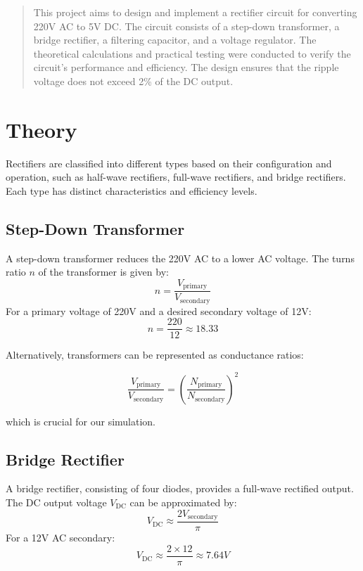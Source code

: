 \documentclass{zc-ust-hw}
\begin{document}
\maketitle
\tableofcontents

\begin{abstract}
This project aims to design and implement a rectifier circuit for converting
220V AC to 5V DC. The circuit consists of a step-down transformer, a bridge
rectifier, a filtering capacitor, and a voltage regulator. The theoretical
calculations and practical testing were conducted to verify the circuit's
performance and efficiency. The design ensures that the ripple voltage does not
exceed 2\% of the DC output.
\end{abstract}

\newpage

\section{Theory}
Rectifiers are classified into different types based on their configuration and
operation, such as half-wave rectifiers, full-wave rectifiers, and bridge
rectifiers. Each type has distinct characteristics and efficiency levels.

\subsection{Step-Down Transformer}
A step-down transformer reduces the 220V AC to a lower AC voltage. The turns ratio \( n \) of the transformer is given by:
\[
n = \frac{V_{\text{primary}}}{V_{\text{secondary}}}
\]
For a primary voltage of 220V and a desired secondary voltage of 12V:
\[
n = \frac{220}{12} \approx 18.33
\]

Alternatively, transformers can be represented as conductance ratios:

\[
\frac{V_{\text{primary}}}{V_{\text{secondary}}} = \left( \frac{N_{\text{primary}}}{N_{\text{secondary}}} \right)^2
\] 

which is crucial for our simulation.

\subsection{Bridge Rectifier}
A bridge rectifier, consisting of four diodes, provides a full-wave rectified output. The DC output voltage \( V_{\text{DC}} \) can be approximated by:
\[
V_{\text{DC}} \approx \frac{2V_{\text{secondary}}}{\pi}
\]
For a 12V AC secondary:
\[
V_{\text{DC}} \approx \frac{2 \times 12}{\pi} \approx 7.64V
\]
\end{document}
